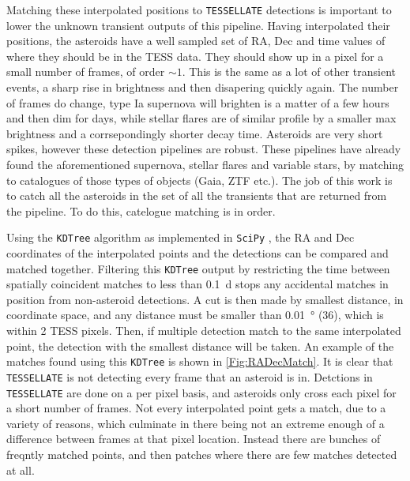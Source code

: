 \documentclass{UCreport}
\begin{document}
Matching these interpolated positions to \texttt{TESSELLATE} detections is important to lower the unknown transient outputs of this pipeline.
Having interpolated their positions, the asteroids have a well sampled set of RA, Dec and time values of where they should be in the TESS data.
They should show up in a pixel for a small number of frames, of order $\sim1$.
This is the same as a lot of other transient events, a sharp rise in brightness and then disapering quickly again.
The number of frames do change, type Ia supernova will brighten is a matter of a few hours and then dim for days, while stellar flares are of similar profile by a smaller max brightness and a corrsepondingly shorter decay time.
Asteroids are very short spikes, however these detection pipelines are robust. %
These pipelines have already found the aforementioned supernova, stellar flares and variable stars, by matching to catalogues of those types of objects (Gaia, ZTF etc.).
The job of this work is to catch all the asteroids in the set of all the transients that are returned from the pipeline.
To do this, catelogue matching is in order.


Using the \texttt{KDTree} algorithm \citep{Maneewongvatana1999} as implemented in \texttt{SciPy} \citep{2020SciPy-NMeth}, the RA and Dec coordinates of the interpolated points and the detections can be compared and matched together.
Filtering this \texttt{KDTree} output by restricting the time between spatially coincident matches to less than \qty{0.1}{\day} stops any accidental matches in position from non-asteroid detections.
A cut is then made by smallest distance, in coordinate space, and any distance must be smaller than \qty{0.01}{\degree} (\qty{36}{\arcsec}), which is within 2 TESS pixels.
Then, if multiple detection match to the same interpolated point, the detection with the smallest distance will be taken.
An example of the matches found using this \texttt{KDTree} is shown in \autoref{Fig:RADecMatch}.
It is clear that \texttt{TESSELLATE} is not detecting every frame that an asteroid is in.
Detctions in \texttt{TESSELLATE} are done on a per pixel basis, and asteroids only cross each pixel for a short number of frames.
Not every interpolated point gets a match, due to a variety of reasons, which culminate in there being not an extreme enough of a difference between frames at that pixel location.
Instead there are bunches of freqntly matched points, and then patches where there are few matches detected at all.

\end{document}

